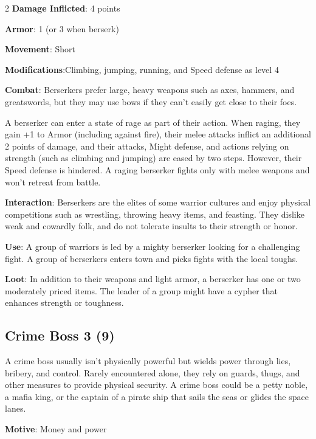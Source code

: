\begin{multicols}{2}
\textbf{Damage Inflicted}: 4 points 

\textbf{Armor}: 1 (or 3 when berserk) 

\textbf{Movement}: Short 

\textbf{Modifications}:Climbing, jumping, running, and Speed defense as level 4 

\textbf{Combat}: Berserkers prefer large, heavy weapons such as axes, hammers, and greatswords, but they may use bows if they can’t easily get close to their foes. 

A berserker can enter a state of rage as part of their action. When raging, they gain +1 to Armor (including against fire), their melee attacks inflict an additional 2 points of damage, and their attacks, Might defense, and actions relying on strength (such as climbing and jumping) are eased by two steps. However, their Speed defense is hindered. A raging berserker fights only with melee weapons and won’t retreat from battle.

\textbf{Interaction}: Berserkers are the elites of some warrior cultures and enjoy physical competitions such as wrestling, throwing heavy items, and feasting. They dislike weak and cowardly folk, and do not tolerate insults to their strength or honor. 

\textbf{Use}: A group of warriors is led by a mighty berserker looking for a challenging fight. A group of berserkers enters town and picks fights with the local toughs. 

\textbf{Loot}: In addition to their weapons and light armor, a berserker has one or two moderately priced items. The leader of a group might have a cypher that enhances strength or toughness.

\subsection{Crime Boss	3 (9)}

A crime boss usually isn’t physically powerful but wields power through lies, bribery, and control. Rarely encountered alone, they rely on guards, thugs, and other measures to provide physical security. A crime boss could be a petty noble, a mafia king, or the captain of a pirate ship that sails the seas or glides the space lanes. 

\textbf{Motive}: Money and power


\end{multicols}

